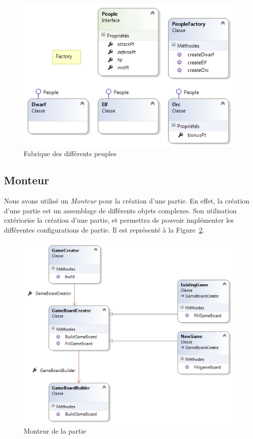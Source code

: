 \documentclass[a4paper]{article}
\begin{document}
\begin{figure}[ht]
\centering
	\includegraphics[width=\textwidth]{../Schemas/class_People_Factory.png}
		\caption{Fabrique des différents peuples}
		\label{fig:class_factory}
\end{figure}

\clearpage
	\subsection{Monteur}
Nous avons utilisé un \textit{Monteur} pour la création d'une partie. En effet, la création d'une partie est un assemblage de différents objets complexes. Son utilisation extériorise la création d'une partie, et permettra de pouvoir implémenter les différentes configurations de partie. Il est représenté à la Figure~\ref{fig:class_builder}.

\begin{figure}[ht]
\centering
	\includegraphics[width=\textwidth]{../Schemas/class_GameBoardBuilder_Builder.png}
		\caption{Monteur de la partie}
		\label{fig:class_builder}
\end{figure}
\end{document}
